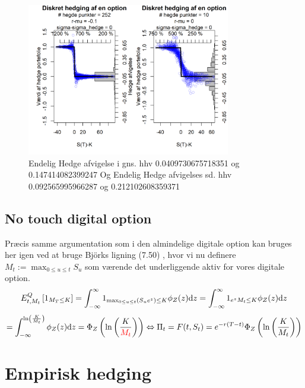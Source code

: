 \documentclass{article}
\theoremstyle{definition}
\theoremstyle{remark}
\newcommand\ens{\Leftrightarrow}
\begin{document}
\begin{figure}
    \centering
    \includegraphics[width=3.5in]{Overleaf/3 opttype_mu_Nhedge.png}
    \caption{Endelig Hedge afvigelse i gns. hhv 0.0409730675718351 og 0.147414082399247 Og Endelig Hedge afvigelses sd. hhv 0.092565995966287 og 0.212102608359371}
    \label{fig:my_label2}
\end{figure}




\subsection{No touch digital option}
Præcis samme argumentation som i den almindelige digitale option kan bruges her igen ved at bruge Björks ligning (7.50) \cite{Bjork2020}, hvor vi nu definere $M_t:=\max_{0\leq u\leq t}S_u$ som værende \color{red}det underliggende aktiv for vores digitale option.\color{black}
$$E^Q_{t,M_t}\left[1_{M_T\leq K}\right]=\int_{-\infty}^{\infty}1_{\max_{0\leq u\leq t} (S_ue^{z})\leq K}\phi_Z(z)\text dz=\int_{-\infty}^{\infty}1_{e^{z}M_t\leq K}\phi_Z(z)\text dz$$
$$=\int_{-\infty}^{\ln\left(\frac K{M_t}\right)}\phi_Z(z)\text d z=\Phi_Z\left(\ln\left(\frac{K}{\color{red} M_t}\color{black}\right)\right)\ens \Pi_t=F(t,S_t)=e^{-r(T-t)}\Phi_Z\left(\ln\left(\frac{K}{M_t}\right)\right)$$

\section{Empirisk hedging}
\end{document}
